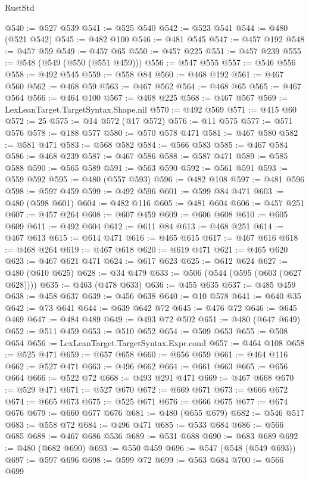 \begin{lexlean}{RustStd}
\begin{coremodule}
{\begin{coremodule}
{{{{{{{{{{{{{{{{{{{{{{{{{{{{{{{{{@540 := @527 @539
@541 := @525 @540
@542 := @523 @541
@544 := @480 (@521 @542)
@545 := @482 @100
@546 := @481 @545
@547 := @457 @192
@548 := @457 @59
@549 := @457 @65
@550 := @457 @225
@551 := @457 @239
@555 := @548 (@549 (@550 (@551 @459)))
@556 := @547 @555
@557 := @546 @556
@558 := @492 @545
@559 := @558 @84
@560 := @468 @192
@561 := @467 @560
@562 := @468 @59
@563 := @467 @562
@564 := @468 @65
@565 := @467 @564
@566 := @464 @100
@567 := @468 @225
@568 := @467 @567
@569 := LexLeanTarget.TargetSyntax.Shape.nil
@570 := @492 @569
@571 := @415 @60
@572 := 25
@575 := @14 @572 (@17 @572)
@576 := @11 @575
@577 := @571 @576
@578 := @188 @577
@580 := @570 @578 @471
@581 := @467 @580
@582 := @581 @471
@583 := @568 @582
@584 := @566 @583
@585 := @467 @584
@586 := @468 @239
@587 := @467 @586
@588 := @587 @471
@589 := @585 @588
@590 := @565 @589
@591 := @563 @590
@592 := @561 @591
@593 := @559 @592
@595 := @480 (@557 @593)
@596 := @482 @108
@597 := @481 @596
@598 := @597 @459
@599 := @492 @596
@601 := @599 @84 @471
@603 := @480 (@598 @601)
@604 := @482 @116
@605 := @481 @604
@606 := @457 @251
@607 := @457 @264
@608 := @607 @459
@609 := @606 @608
@610 := @605 @609
@611 := @492 @604
@612 := @611 @84
@613 := @468 @251
@614 := @467 @613
@615 := @614 @471
@616 := @465 @615
@617 := @467 @616
@618 := @468 @264
@619 := @467 @618
@620 := @619 @471
@621 := @465 @620
@623 := @467 @621 @471
@624 := @617 @623
@625 := @612 @624
@627 := @480 (@610 @625)
@628 := @34 @479
@633 := @506 (@544 (@595 (@603 (@627 @628))))
@635 := @463 (@478 @633)
@636 := @455 @635
@637 := @485 @459
@638 := @458 @637
@639 := @456 @638
@640 := @10 @578
@641 := @640 @35
@642 := @73 @641
@644 := @639 @642 @72
@645 := @476 @72
@646 := @645 @469
@647 := @484 @489
@649 := @493 @72 @502
@651 := @480 (@647 @649)
@652 := @511 @459
@653 := @510 @652
@654 := @509 @653
@655 := @508 @654
@656 := LexLeanTarget.TargetSyntax.Expr.cond
@657 := @464 @108
@658 := @525 @471
@659 := @657 @658
@660 := @656 @659
@661 := @464 @116
@662 := @527 @471
@663 := @496 @662
@664 := @661 @663
@665 := @656 @664
@666 := @522 @72
@668 := @493 @291 @471
@669 := @467 @668
@670 := @529 @471
@671 := @527 @670
@672 := @669 @671
@673 := @666 @672
@674 := @665 @673
@675 := @525 @671
@676 := @666 @675
@677 := @674 @676
@679 := @660 @677 @676
@681 := @480 (@655 @679)
@682 := @546 @517
@683 := @558 @72
@684 := @496 @471
@685 := @533 @684
@686 := @566 @685
@688 := @467 @686 @536
@689 := @531 @688
@690 := @683 @689
@692 := @480 (@682 @690)
@693 := @550 @459
@696 := @547 (@548 (@549 @693))
@697 := @597 @696
@698 := @599 @72
@699 := @563 @684
@700 := @566 @699
}}}}}}}}}}}}}}}}}}}}}}}}}}}}}}}}}
\end{coremodule}}
\end{coremodule}
\end{lexlean}

